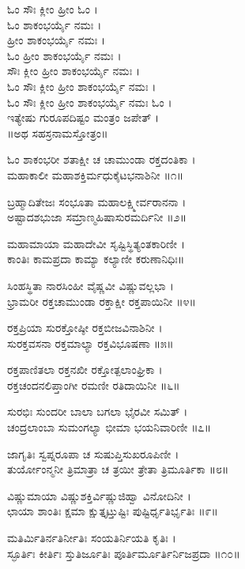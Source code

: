 
ಓಂ ಸೌಃ ಕ್ಲೀಂ ಹ್ರೀಂ ಓಂ ।\\
ಓಂ ಶಾಕಂಭರ್ಯೈ ನಮಃ ।\\
ಹ್ರೀಂ ಶಾಕಂಭರ್ಯೈ ನಮಃ ।\\
ಓಂ ಹ್ರೀಂ ಶಾಕಂಭರ್ಯೈ ನಮಃ ।\\
ಸೌಃ ಕ್ಲೀಂ ಹ್ರೀಂ ಶಾಕಂಭರ್ಯೈ ನಮಃ ।\\
ಓಂ ಸೌಃ ಕ್ಲೀಂ ಹ್ರೀಂ ಶಾಕಂಭರ್ಯೈ ನಮಃ ।\\
ಓಂ ಸೌಃ ಕ್ಲೀಂ ಹ್ರೀಂ ಶಾಕಂಭರ್ಯೈ ನಮಃ ಓಂ ।\\
ಇತ್ಯೇಷು ಗುರೂಪದಿಷ್ಟಂ ಮಂತ್ರಂ ಜಪೇತ್ ।\\

॥ಅಥ ಸಹಸ್ರನಾಮಸ್ತೋತ್ರಂ॥

ಓಂ ಶಾಕಂಭರೀ ಶತಾಕ್ಷೀ ಚ ಚಾಮುಂಡಾ ರಕ್ತದಂತಿಕಾ ।\\
ಮಹಾಕಾಲೀ ಮಹಾಶಕ್ತಿರ್ಮಧುಕೈಟಭನಾಶಿನೀ ॥೧॥

ಬ್ರಹ್ಮಾದಿತೇಜಃ ಸಂಭೂತಾ ಮಹಾಲಕ್ಷ್ಮೀರ್ವರಾನನಾ ।\\
ಅಷ್ಟಾದಶಭುಜಾ ಸಮ್ರಾಣ್ಮಹಿಷಾಸುರಮರ್ದಿನೀ ॥೨॥

ಮಹಾಮಾಯಾ ಮಹಾದೇವೀ ಸೃಷ್ಟಿಸ್ಥಿತ್ಯಂತಕಾರಿಣೀ ।\\
ಕಾಂತಿಃ ಕಾಮಪ್ರದಾ ಕಾಮ್ಯಾ ಕಲ್ಯಾಣೀ ಕರುಣಾನಿಧಿಃ॥

ಸಿಂಹಸ್ಥಿತಾ ನಾರಸಿಂಹೀ ವೈಷ್ಣವೀ ವಿಷ್ಣುವಲ್ಲಭಾ ।\\
ಭ್ರಾಮರೀ ರಕ್ತಚಾಮುಂಡಾ ರಕ್ತಾಕ್ಷೀ ರಕ್ತಪಾಯಿನೀ ॥೪॥

ರಕ್ತಪ್ರಿಯಾ ಸುರಕ್ತೋಷ್ಠೀ ರಕ್ತಬೀಜವಿನಾಶಿನೀ ।\\
ಸುರಕ್ತವಸನಾ ರಕ್ತಮಾಲ್ಯಾ ರಕ್ತವಿಭೂಷಣಾ ॥೫॥

ರಕ್ತಪಾಣಿತಲಾ ರಕ್ತನಖೀ ರಕ್ತೋತ್ಪಲಾಂಘ್ರಿಕಾ ।\\
ರಕ್ತಚಂದನಲಿಪ್ತಾಂಗೀ ರಮಣೀ ರತಿದಾಯಿನೀ ॥೬॥

ಸುರಭಿಃ ಸುಂದರೀ ಬಾಲಾ ಬಗಲಾ ಭೈರವೀ ಸಮಿತ್ ।\\
ಚಂದ್ರಲಾಂಬಾ ಸುಮಂಗಲ್ಯಾ ಭೀಮಾ ಭಯನಿವಾರಿಣೀ ॥೭॥

ಜಾಗೃತಿಃ ಸ್ವಪ್ನರೂಪಾ ಚ ಸುಷುಪ್ತಿಸುಖರೂಪಿಣೀ ।\\
ತುರ್ಯೋಂನ್ಮನೀ ತ್ರಿಮಾತ್ರಾ ಚ ತ್ರಯೀ ತ್ರೇತಾ ತ್ರಿಮೂರ್ತಿಕಾ ॥೮॥

ವಿಷ್ಣುಮಾಯಾ ವಿಷ್ಣುಶಕ್ತಿರ್ವಿಷ್ಣುಜಿಹ್ವಾ ವಿನೋದಿನೀ ।\\
ಛಾಯಾ ಶಾಂತಿಃ ಕ್ಷಮಾ ಕ್ಷುತ್ತೃಟ್ತುಷ್ಟಿಃ ಪುಷ್ಟಿರ್ಧೃತಿರ್ಭೃತಿಃ ॥೯॥

ಮತಿರ್ಮಿತಿರ್ನತಿರ್ನೀತಿಃ ಸಂಯತಿರ್ನಿಯತಿ ಕೃತಿಃ ।\\
ಸ್ಫೂರ್ತಿಃ ಕೀರ್ತಿಃ ಸ್ತುತಿರ್ಜೂತಿಃ ಪೂರ್ತಿರ್ಮೂರ್ತಿರ್ನಿಜಪ್ರದಾ ॥೧೦॥

